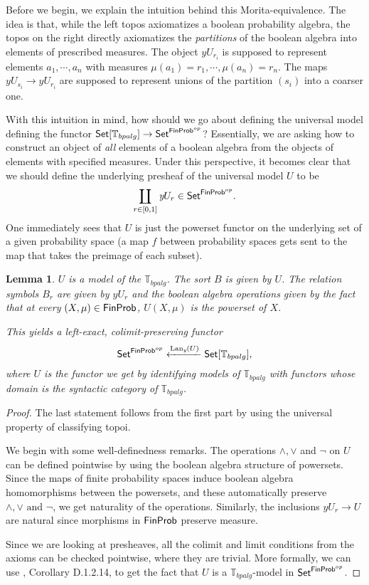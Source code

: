 \documentclass[a4paper]{amsproc}
\theoremstyle{plain}
\newtheorem{lemma}[theorem]{Lemma}
\theoremstyle{definition}
\theoremstyle{remark}
\numberwithin{equation}{section}
\newcommand{\y}{\textit{y}}
\DeclareMathOperator{\Lan}{Lan}
\newcommand{\Set}{\textup{\textsf{Set}}}
\newcommand{\FinProb}{\textup{\textsf{FinProb}}}
\begin{document}
Before we begin, we explain the intuition behind this Morita-equivalence. The idea is that, while the left topos axiomatizes a boolean probability algebra, the topos on the right directly axiomatizes the \emph{partitions} of the boolean algebra into elements of prescribed measures. The object $\y U_{r_i}$ is supposed to represent elements $a_1,\cdots,a_n$ with measures $\mu(a_1) = r_1,\cdots,\mu(a_n) = r_n$. The maps $\y U_{s_i} \to \y U_{r_i}$ are supposed to represent unions of the partition $(s_i)$ into a coarser one.

With this intuition in mind, how should we go about defining the universal model defining the functor $\Set[\mathbb{T}_{bpalg}] \to \Set^{\FinProb^{op}}$? Essentially, we are asking how to construct an object of \emph{all} elements of a boolean algebra from the objects of elements with specified measures. Under this perspective, it becomes clear that we should define the underlying presheaf of the universal model $U$ to be
\[
\coprod_{r \in [0,1]} \y U_r \in \Set^{\FinProb^{op}} .
\]
One immediately sees that $U$ is just the powerset functor on the underlying set of a given probability space (a map $f$ between probability spaces gets sent to the map that takes the preimage of each subset).

\begin{lemma} \label{universal model}
$U$ is a model of the $\mathbb{T}_{bpalg}$. The sort $B$ is given by $U$. The relation symbols $B_r$ are given by $\y U_r$ and the boolean algebra operations given by the fact that at every $(X,\mu) \in \FinProb$, $U(X, \mu)$ is the powerset of $X$.

This yields a left-exact, colimit-preserving functor
\[
    \Set^{\FinProb^{op}} \xleftarrow{\Lan_{\y}(U)} \Set[\mathbb{T}_{bpalg}],
\]
where $U$ is the functor we get by identifying models of $\mathbb{T}_{bpalg}$ with functors whose domain is the syntactic category of $\mathbb{T}_{bpalg}$.
\end{lemma}
\begin{proof}
The last statement follows from the first part by using the universal property of classifying topoi.

We begin with some well-definedness remarks. The operations $\wedge, \vee$ and $\neg$ on $U$ can be defined pointwise by using the boolean algebra structure of powersets. Since the maps of finite probability spaces induce boolean algebra homomorphisms between the powersets, and these automatically preserve $\wedge, \vee \text{ and } \neg$, we get naturality of the operations. Similarly, the inclusions $\y U_r \to U$ are natural since morphisms in $\FinProb$ preserve measure.

Since we are looking at presheaves, all the colimit and limit conditions from the axioms can be checked pointwise, where they are trivial. More formally, we can use \cite{elephant}, Corollary D.1.2.14, to get the fact that $U$ is a $\mathbb{T}_{bpalg}$-model in $\Set^{\FinProb^{op}}$.
\end{proof}
\end{document}

